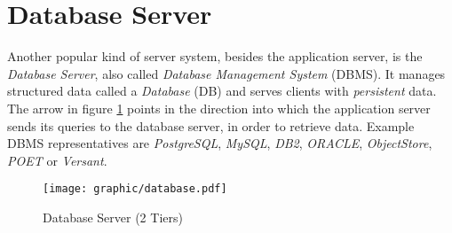 %
%
%
%
%
%
%

\section{Database Server}
\label{database_server_heading}

Another popular kind of server system, besides the application server, is the
\emph{Database Server}, also called \emph{Database Management System} (DBMS).
It manages structured data called a \emph{Database} (DB) and serves clients
with \emph{persistent} data. The arrow in figure \ref{database_figure} points
in the direction into which the application server sends its queries to the
database server, in order to retrieve data. Example DBMS representatives are
\emph{PostgreSQL}, \emph{MySQL}, \emph{DB2}, \emph{ORACLE}, \emph{ObjectStore},
\emph{POET} or \emph{Versant}.

\begin{figure}[ht]
    \begin{center}
        \texttt{[image: graphic/database.pdf]}
        \caption{Database Server (2 Tiers)}
        \label{database_figure}
    \end{center}
\end{figure}

